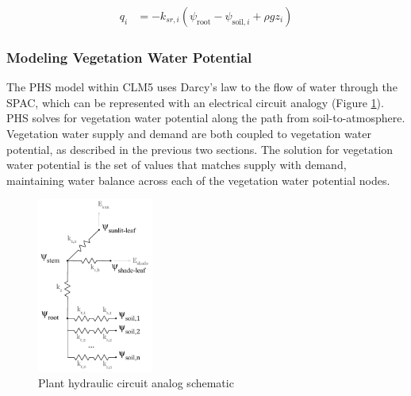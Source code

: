 \documentclass[draft,linenumbers]{agujournal}
\begin{document}
    \begin{linenomath*}
    \begin{equation}
        \begin{aligned}
    q_i &= -k_{sr,i}  \left(\psi_{\text{root}}-\psi_{\text{soil},i}+\rho g z_i\right)
    \label{phs:sink}
    \end{aligned}
    \end{equation}
    \end{linenomath*}

\subsubsection{Modeling Vegetation Water Potential}
\label{sect:vwp}
  The PHS model within CLM5 uses Darcy's law to  the flow of water through the SPAC, which can be represented with an electrical circuit analogy (Figure \ref{circuit}).
  PHS solves for vegetation water potential along the path from soil-to-atmosphere.
  Vegetation water supply and demand are both coupled to vegetation water potential, as described in the previous two sections.
  The solution for vegetation water potential is the set of values that matches supply with demand, maintaining water balance across each of the vegetation water potential nodes.

  \begin{figure}[h]
     \centering
     \includegraphics[width=9pc]{circuit.pdf}
     \caption{Plant hydraulic circuit analog schematic}
     \label{circuit}
  \end{figure}
\end{document}
